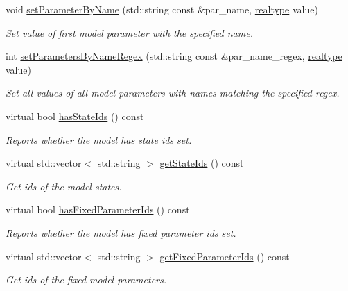 \begin{DoxyCompactItemize}
void \mbox{\hyperlink{classamici_1_1_model_a6c5ceb2ba684cf68a7f21ad865091200}{set\+Parameter\+By\+Name}} (std\+::string const \&par\+\_\+name, \mbox{\hyperlink{namespaceamici_a1bdce28051d6a53868f7ccbf5f2c14a3}{realtype}} value)
\begin{DoxyCompactList}\small\item\em Set value of first model parameter with the specified name. \end{DoxyCompactList}\item 
int \mbox{\hyperlink{classamici_1_1_model_a1307ed45ccda80e84174d6b495c85d8d}{set\+Parameters\+By\+Name\+Regex}} (std\+::string const \&par\+\_\+name\+\_\+regex, \mbox{\hyperlink{namespaceamici_a1bdce28051d6a53868f7ccbf5f2c14a3}{realtype}} value)
\begin{DoxyCompactList}\small\item\em Set all values of all model parameters with names matching the specified regex. \end{DoxyCompactList}\item 
virtual bool \mbox{\hyperlink{classamici_1_1_model_aa249cbfe9223101f4492ace0b14e4eab}{has\+State\+Ids}} () const
\begin{DoxyCompactList}\small\item\em Reports whether the model has state ids set. \end{DoxyCompactList}\item 
virtual std\+::vector$<$ std\+::string $>$ \mbox{\hyperlink{classamici_1_1_model_a8a93b9fcddaaa762dacc654ffc379af1}{get\+State\+Ids}} () const
\begin{DoxyCompactList}\small\item\em Get ids of the model states. \end{DoxyCompactList}\item 
virtual bool \mbox{\hyperlink{classamici_1_1_model_af6cb68d368b1288fa0d7515242bf7a5b}{has\+Fixed\+Parameter\+Ids}} () const
\begin{DoxyCompactList}\small\item\em Reports whether the model has fixed parameter ids set. \end{DoxyCompactList}\item 
virtual std\+::vector$<$ std\+::string $>$ \mbox{\hyperlink{classamici_1_1_model_a802aef820cb7ddabfb6330abba320bcf}{get\+Fixed\+Parameter\+Ids}} () const
\begin{DoxyCompactList}\small\item\em Get ids of the fixed model parameters. \end{DoxyCompactList}\item 

\end{DoxyCompactItemize}
